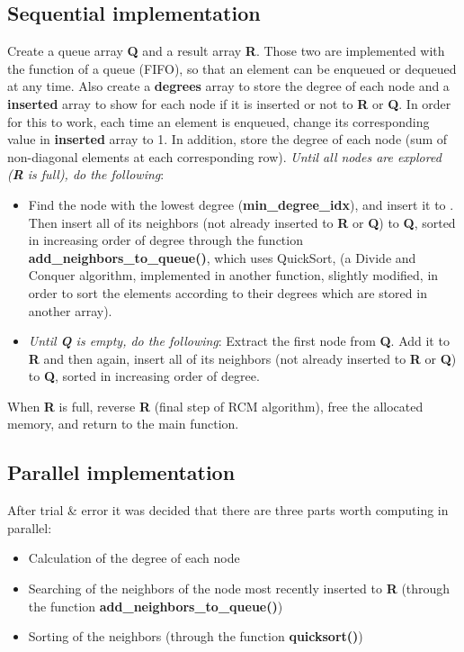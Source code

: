 \documentclass[letterpaper,12pt]{article}
\begin{document}
\subsection{Sequential implementation}
\vspace{2mm} %

Create a queue array \textbf{Q} and a result array \textbf{R}. Those two are implemented with the function of a queue (FIFO), so that an element can be enqueued or dequeued at any time. Also create a \textbf{degrees} array to store the degree of each node and a \textbf{inserted} array to show for each node if it is inserted or not to \textbf{R} or \textbf{Q}. In order for this to work, each time an element is enqueued, change its corresponding value in \textbf{inserted} array to 1. In addition, store the degree of each node (sum of non-diagonal elements at each corresponding row).
\newline\newline
\textit{Until all nodes are explored (\textbf{R} is full), do the following}: 
\begin{itemize}
	\item Find the node with the lowest degree (\textbf{min\_degree\_idx}), and insert it to \textbf{}. Then insert all of its neighbors (not already inserted to \textbf{R} or \textbf{Q}) to \textbf{Q}, sorted in increasing order of degree through the function \textbf{add\_neighbors\_to\_queue()}, which uses QuickSort, (a Divide and Conquer algorithm, implemented in another function, slightly modified, in order to sort the elements according to their degrees which are stored in another array).
	\item \textit{Until \textbf{Q} is empty, do the following}: Extract the first node from \textbf{Q}. Add it to \textbf{R} and then again, insert all of its neighbors (not already inserted to \textbf{R} or \textbf{Q}) to \textbf{Q}, sorted in increasing order of degree.
\end{itemize}
When \textbf{R} is full, reverse \textbf{R} (final step of RCM algorithm), free the allocated memory, and return to the main function.

\subsection{Parallel implementation}
\vspace{2mm} %

After trial \& error it was decided that there are three parts worth computing in parallel:
\begin{itemize}
	\item Calculation of the degree of each node
	\item Searching of the neighbors of the node most recently inserted to \textbf{R} (through the function \textbf{add\_neighbors\_to\_queue()})
	\item Sorting of the neighbors (through the function \textbf{quicksort()})
\end{itemize}
\end{document}
